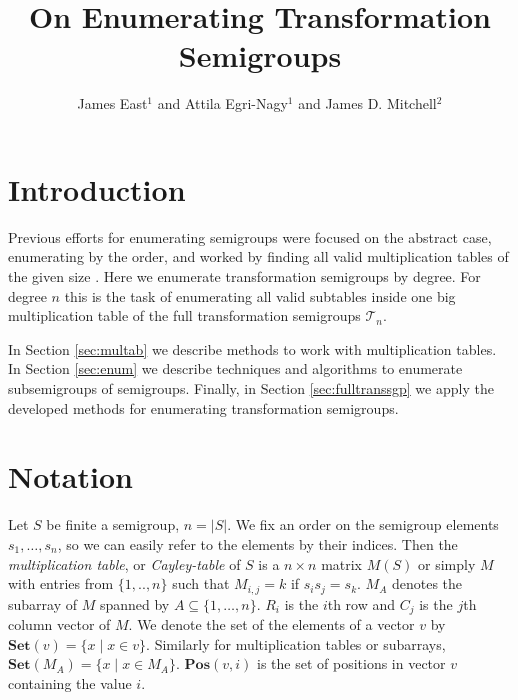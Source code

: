 \documentclass{amsart}
\newcommand{\cT}{{\mathcal T}}
\newcommand{\Set}{\mathbf{Set}}
\newcommand{\Pos}{\mathbf{Pos}}
\theoremstyle{plain}
\theoremstyle{definition}
\begin{document}
\title{On Enumerating Transformation Semigroups}
\author{James East$^1$ and Attila Egri-Nagy$^{1}$ and James D. Mitchell$^2$}
\address{$^1$Centre for Research in Mathematics, School of Computing, Engineering and Mathematics, University of Western Sydney (Parramatta Campus), Locked Bag 1797, Penrith, NSW 2751, Australia}
\address{$^2$ Mathematical Institute, University of St Andrews, North Haugh, St Andrews, Fife, KY16 9SS, Scotland}

\maketitle

\tableofcontents
\section{Introduction}
Previous efforts for enumerating semigroups were focused on the abstract case, enumerating by the order, and worked by finding all valid multiplication tables of the given size \cite{monoidenum2009}.
Here we enumerate transformation semigroups by degree.
For degree $n$ this is the task of enumerating all valid subtables inside one big multiplication table of the  full transformation semigroups $\cT_n$.

In Section \ref{sec:multab} we describe methods to work with multiplication tables.
In Section \ref{sec:enum} we describe techniques and algorithms to enumerate subsemigroups of semigroups.
Finally, in Section \ref{sec:fulltranssgp} we apply the developed methods for enumerating transformation semigroups.
\section{Notation}
Let $S$ be finite a semigroup, $n=|S|$.
We fix an order on the semigroup elements $s_1,\ldots, s_n$, so we can easily refer to the elements by their indices. 
Then the  \emph{multiplication table}, or \emph{Cayley-table} of $S$ is a $n\times n$ matrix $M(S)$ or simply $M$ with entries from $\{1,..,n\}$ such that $M_{i,j}=k$ if $s_is_j=s_k$.
$M_A$ denotes the subarray of $M$ spanned by $A\subseteq\{1,\ldots,n\}$.
$R_i$ is the $i$th row and $C_j$ is the $j$th column vector of $M$.
We denote the set of the elements of a vector $v$ by $\Set(v)=\{x\mid x\in v\}$.
Similarly for multiplication tables or subarrays, $\Set(M_A)=\{x\mid x\in M_A\}$.
$\Pos(v,i)$ is the set of positions in vector $v$ containing the value $i$.
\end{document}
